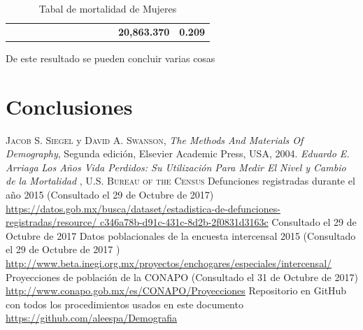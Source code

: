 \documentclass[fontsize=11pt]{article}
\begin{document}
\begin{landscape}
\begin{table}[]
\begin{tabular}{lrrrrrrrrrr|r|r|}
\multicolumn{1}{r}{}    &                            &                            &                            &                              &                             &                                  &                                    &                             &                            &                        & \multicolumn{1}{c|}{\textbf{20,863.370}} & \multicolumn{1}{c|}{\textbf{0.209}} \\ \cline{12-13} 
\end{tabular}
\caption{Tabal de mortalidad de Mujeres}
\label{my-label}
\end{table}
\end{landscape}
De este resultado se pueden concluir varias cosas
\section*{Conclusiones}
\begin{thebibliography}{X}
	 \textsc{Jacob S. Siegel} y \textsc{David A. Swanson}, \textit{The Methods And
	Materials Of Demography}, Segunda edición,
	Elsevier Academic Press, USA, 2004.
	 \textit{Eduardo E. Arriaga}\textit{ Los Años Vida Perdidos: Su Utilización Para 		Medir El Nivel y Cambio de la Mortalidad} , \textsc{U.S. Bureau of the Census} 
	 Defunciones registradas durante el año 2015 (Consultado el 29 de Octubre de 2017)  	\url{https://datos.gob.mx/busca/dataset/estadistica-de-defunciones-registradas/resource/				c346a78b-d91c-431c-8d2b-2f0831d3163c} Consultado el 29 de Octubre de 2017 
	 Datos poblacionales de la encuesta intercensal 2015 (Consultado el 29 de Octubre 		de 2017 ) \url{http://www.beta.inegi.org.mx/proyectos/enchogares/especiales/intercensal/} 
	 Proyecciones de población de la CONAPO (Consultado el 31 de Octubre de 2017) 			\url{http://www.conapo.gob.mx/es/CONAPO/Proyecciones} 
	 Repositorio en GitHub con todos los procedimientos usados en este documento 			\url{https://github.com/aleespa/Demografia}
\end{thebibliography}
\end{document}
